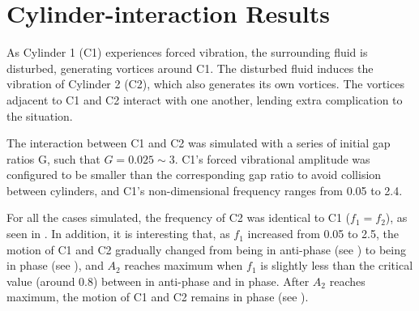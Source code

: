 \section{Cylinder-interaction Results} \label{sec results}

As Cylinder 1 (C1) experiences forced vibration, the surrounding fluid is disturbed, generating vortices around C1. The disturbed fluid induces the vibration of Cylinder 2 (C2), which also generates its own vortices. The vortices adjacent to C1 and C2 interact with one another, lending extra complication to the situation. 

The interaction between C1 and C2 was simulated with a series of initial gap ratios G, such that $G=0.025 \sim3$.  C1's forced vibrational amplitude was configured to be smaller than the corresponding gap ratio to avoid collision between cylinders, and C1's non-dimensional frequency ranges from 0.05 to 2.4.



For all the cases simulated, the frequency of C2 was identical to C1 ($f_1=f_2  $), as seen in . In addition, it is interesting that, as $ f_1 $ increased from 0.05 to 2.5, the motion of C1 and C2 gradually changed from being in anti-phase (see ) to being in phase (see ), and $ A_2 $ reaches maximum when $ f_1 $ is slightly less than the critical value (around 0.8) between in anti-phase and in phase. After $ A_2 $ reaches maximum, the motion of C1 and C2 remains in phase (see ). 

